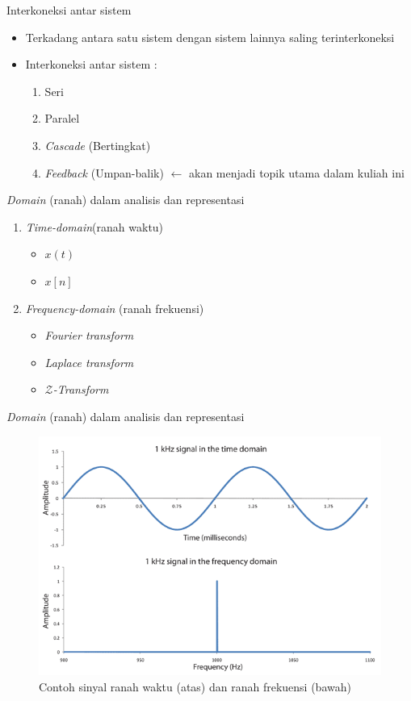 \documentclass[pdflatex,compress,mathserif]{beamer}
\begin{document}
\begin{frame}{Interkoneksi antar sistem}
	\begin{itemize}
		\item Terkadang antara satu sistem dengan sistem lainnya saling terinterkoneksi
		\item Interkoneksi antar sistem :
		\begin{enumerate}
			\item Seri
			\item Paralel
			\item \textit{Cascade} (Bertingkat)
			\item \textit{Feedback} (Umpan-balik) $ \leftarrow $ akan menjadi topik utama dalam kuliah ini
		\end{enumerate}
	\end{itemize}
\end{frame}

\begin{frame}{\textit{Domain} (ranah) dalam analisis dan representasi}
	\begin{enumerate}
		\item \textit{Time-domain}(ranah waktu)
		\begin{itemize}
			\item $ x(t) $
			\item $ x[n] $
		\end{itemize}
		\item \textit{Frequency-domain} (ranah frekuensi)
		\begin{itemize}
			\item \textit{Fourier transform}
			\item \textit{Laplace transform}
			\item \textit{$ \mathcal{Z} $-Transform}
		\end{itemize}
	\end{enumerate}
\end{frame}

\begin{frame}{\textit{Domain} (ranah) dalam analisis dan representasi}
	\begin{figure}
		\centering
		\includegraphics[width=0.7\linewidth]{img/00.TimeDomain}
		\caption{Contoh sinyal ranah waktu (atas) dan ranah frekuensi (bawah)}
	\end{figure}
\end{frame}
\end{document}
